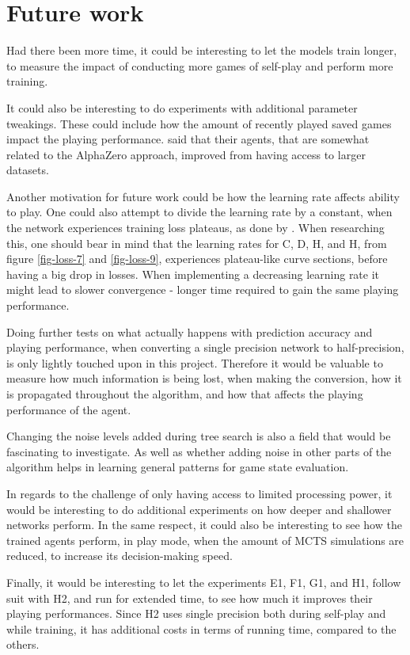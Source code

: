 \chapter{Future work}
Had there been more time, it could be interesting to let the models train longer, to measure the impact of conducting more games of self-play and perform more training.

It could also be interesting to do experiments with additional parameter tweakings. These could include how the amount of recently played saved games impact the playing performance. \citeauthor{AnthonyThomasandTianZhengandBarber2017} said that their agents, that are somewhat related to the AlphaZero approach, improved from having access to larger datasets\cite{AnthonyThomasandTianZhengandBarber2017}.

Another motivation for future work could be how the learning rate affects ability to play. One could also attempt to divide the learning rate by a constant, when the network experiences training loss plateaus, as done by \citeauthor{He2016}\cite{He2016}. 
When researching this, one should bear in mind that the learning rates for C, D, H, and H, from figure \ref{fig-loss-7} and \ref{fig-loss-9}, experiences plateau-like curve sections, before having a big drop in losses. When implementing a decreasing learning rate it might lead to slower convergence - longer time required to gain the same playing performance.

Doing further tests on what actually happens with prediction accuracy and playing performance, when converting a single precision network to half-precision, is only lightly touched upon in this project. Therefore it would be valuable to measure how much information is being lost, when making the conversion, how it is propagated throughout the algorithm, and how that affects the playing performance of the agent.

Changing the noise levels added during tree search is also a field that would be fascinating to investigate. As well as whether adding noise in other parts of the algorithm helps in learning general patterns for game state evaluation.

In regards to the challenge of only having access to limited processing power, it would be interesting to do additional experiments on how deeper and shallower networks perform. In the same respect, it could also be interesting to see how the trained agents perform, in play mode, when the amount of MCTS simulations are reduced, to increase its decision-making speed.

Finally, it would be interesting to let the experiments E1, F1, G1, and H1, follow suit with H2, and run for extended time, to see how much it improves their playing performances. Since H2 uses single precision both during self-play and while training, it has additional costs in terms of running time, compared to the others.